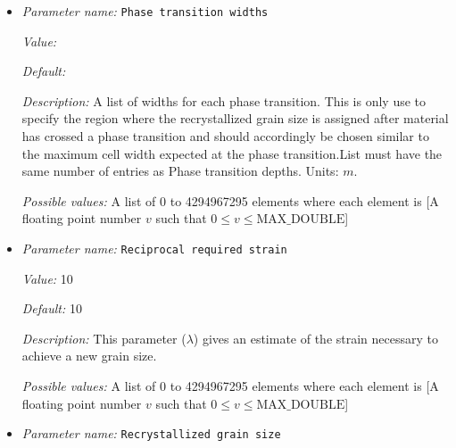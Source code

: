 \begin{itemize}
{\it Default:} 


{\it Description:} A list of temperatures where phase transitions occur. Higher or lower temperatures lead to phase transition ocurring in smaller or greater depths than given in Phase transition depths, depending on the Clapeyron slope given in Phase transition Clapeyron slopes. List must have the same number of entries as Phase transition depths. Units: $K$.


{\it Possible values:} A list of 0 to 4294967295 elements where each element is [A floating point number $v$ such that $0 \leq v \leq \text{MAX\_DOUBLE}$]
\item {\it Parameter name:} {\tt Phase transition widths}
\label{parameters:Material model/Grain size model/Phase transition widths}
\label{parameters:Material_20model/Grain_20size_20model/Phase_20transition_20widths}


{\it Value:} 


{\it Default:} 


{\it Description:} A list of widths for each phase transition. This is only use to specify the region where the recrystallized grain size is assigned after material has crossed a phase transition and should accordingly be chosen similar to the maximum cell width expected at the phase transition.List must have the same number of entries as Phase transition depths. Units: $m$.


{\it Possible values:} A list of 0 to 4294967295 elements where each element is [A floating point number $v$ such that $0 \leq v \leq \text{MAX\_DOUBLE}$]
\item {\it Parameter name:} {\tt Reciprocal required strain}
\label{parameters:Material model/Grain size model/Reciprocal required strain}
\label{parameters:Material_20model/Grain_20size_20model/Reciprocal_20required_20strain}


{\it Value:} 10


{\it Default:} 10


{\it Description:} This parameter ($\lambda$) gives an estimate of the strain necessary to achieve a new grain size. 


{\it Possible values:} A list of 0 to 4294967295 elements where each element is [A floating point number $v$ such that $0 \leq v \leq \text{MAX\_DOUBLE}$]
\item {\it Parameter name:} {\tt Recrystallized grain size}
\label{parameters:Material model/Grain size model/Recrystallized grain size}
\label{parameters:Material_20model/Grain_20size_20model/Recrystallized_20grain_20size}



\end{itemize}
